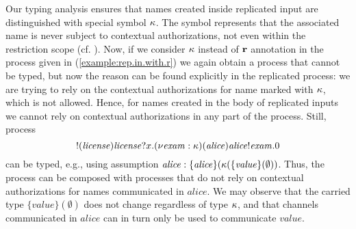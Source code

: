 Our typing analysis ensures that names created inside replicated input are distinguished with special symbol ${\mathbf{\kappa}}$. The symbol represents that the associated name is never subject to contextual authorizations, not even within the restriction scope (cf. ). Now, if we consider ${\mathbf{\kappa}}$ instead of ${\mathbf{r}}$ annotation in the process given in (\ref{example:rep.in.with.r}) %
we again obtain a process that cannot be typed, but now the reason can be found explicitly in the replicated process: we are trying to rely on the contextual authorizations for name marked with ${\mathbf{\kappa}}$, which is not allowed.
% 
Hence, for names created in the body of replicated inputs  we cannot rely on contextual authorizations in any part of the process. Still, process
\begin{equation}\label{example:rep.in.ok}
!({\mathit{license}}){\mathit{license}}?x.(\nu \mathit{exam}: {\mathbf{\kappa}})(\mathit{alice})\mathit{alice}!\mathit{exam}.0
\end{equation}
can be typed, e.g., using assumption $\mathit{alice}: \{\mathit{alice}\}({\mathbf{\kappa}}(\{\mathit{value}\}(\emptyset) )$. Thus, the process can be composed with processes that do not rely on contextual authorizations for names communicated in $\mathit{alice}$.
We may observe that the carried type $\{\mathit{value}\}(\emptyset) $ does not change regardless of type ${\mathbf{\kappa}}$, and that channels communicated in $\mathit{alice}$ can in turn only be used to communicate $\mathit{value}$.


